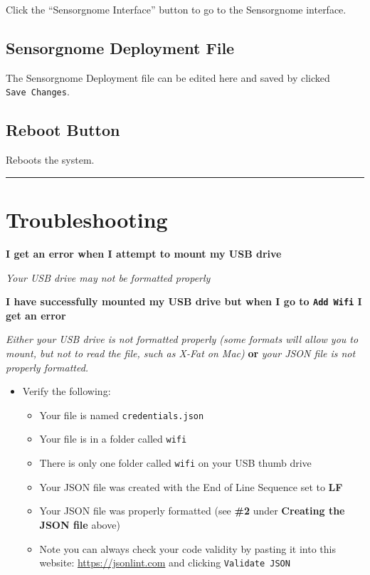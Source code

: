 \documentclass[
]{article}
\providecommand{\tightlist}{%
  \setlength{\itemsep}{0pt}\setlength{\parskip}{0pt}}
\begin{document}
Click the ``Sensorgnome Interface'' button to go to the Sensorgnome
interface.

\hypertarget{sensorgnome-deployment-file}{%
\subsection{Sensorgnome Deployment
File}\label{sensorgnome-deployment-file}}

The Sensorgnome Deployment file can be edited here and saved by clicked
\texttt{Save\ Changes}.

\hypertarget{reboot-button}{%
\subsection{Reboot Button}\label{reboot-button}}

Reboots the system.

\begin{center}\rule{0.5\linewidth}{0.5pt}\end{center}

\hypertarget{troubleshooting}{%
\section{Troubleshooting}\label{troubleshooting}}

\textbf{I get an error when I attempt to mount my USB drive}

\emph{Your USB drive may not be formatted properly}

\textbf{I have successfully mounted my USB drive but when I go to
\texttt{Add\ Wifi} I get an error}

\emph{Either your USB drive is not formatted properly (some formats will
allow you to mount, but not to read the file, such as X-Fat on Mac)}
\textbf{or} \emph{your JSON file is not properly formatted.}

\begin{itemize}
\tightlist
\item
  Verify the following:

  \begin{itemize}
  \tightlist
  \item
    Your file is named \texttt{credentials.json}
  \item
    Your file is in a folder called \texttt{wifi}
  \item
    There is only one folder called \texttt{wifi} on your USB thumb
    drive
  \item
    Your JSON file was created with the End of Line Sequence set to
    \textbf{LF}
  \item
    Your JSON file was properly formatted (see \textbf{\#2} under
    \textbf{Creating the JSON file} above)
  \item
    Note you can always check your code validity by pasting it into this
    website: \url{https://jsonlint.com} and clicking
    \texttt{Validate\ JSON}
  \end{itemize}
\end{itemize}
\end{document}
